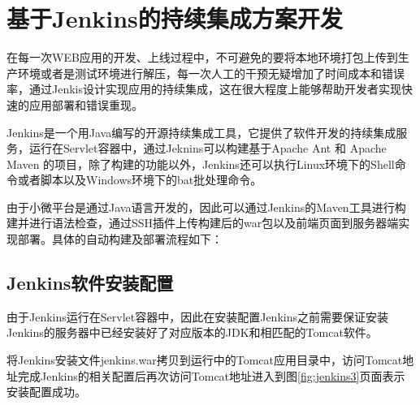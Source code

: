 \section{基于Jenkins的持续集成方案开发}

在每一次WEB应用的开发、上线过程中，不可避免的要将本地环境打包上传到生产环境或者是测试环境进行解压，每一次人工的干预无疑增加了时间成本和错误率，通过Jenkis设计实现应用的持续集成，这在很大程度上能够帮助开发者实现快速的应用部署和错误重现\cite{高珺2015以持续集成方式进行系统自动化部署}。

Jenkins是一个用Java编写的开源持续集成工具，它提供了软件开发的持续集成服务，运行在Servlet容器中，通过Jeknins可以构建基于Apache Ant 和 Apache Maven 的项目，除了构建的功能以外，Jenkins还可以执行Linux环境下的Shell命令或者脚本以及Windows环境下的bat批处理命令\cite{王宁2014基于}。

由于小微平台是通过Java语言开发的，因此可以通过Jenkins的Maven工具进行构建并进行语法检查，通过SSH插件上传构建后的war包以及前端页面到服务器端实现部署\cite{赵亚楠2013基于}。具体的自动构建及部署流程如下：

\subsection{Jenkins软件安装配置}

由于Jenkins运行在Servlet容器中，因此在安装配置Jenkins之前需要保证安装Jenkins的服务器中已经安装好了对应版本的JDK和相匹配的Tomcat软件\cite{赵杰昌2014基于}。

将Jenkins安装文件jenkins.war拷贝到运行中的Tomcat应用目录中，访问Tomcat地址完成Jenkins的相关配置后再次访问Tomcat地址进入到图\ref{fig:jenkins3}页面表示安装配置成功。

